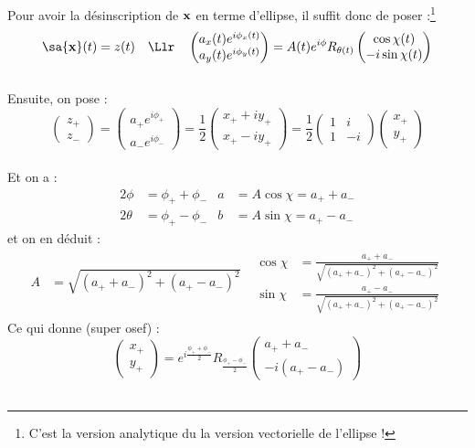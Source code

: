 Pour avoir la désinscription de $\bf{x}$ en terme d’ellipse, il suffit donc de poser :\footnote{C'est la version analytique du la version vectorielle de l'ellipse !}
\[\sa{\bf{x}}(t) = z(t)\quad \Llr\quad \begin{pmatrix}a_x(t) e^{i\phi_x(t)} \\ a_y(t) e^ {i\phi_y(t)}\end{pmatrix} = A(t)e^{i\phi} R_{\theta(t)} \begin{pmatrix} \cos\chi(t) \\ -i\sin\chi(t) \end{pmatrix}\]
\\
Ensuite, on pose :
\[\begin{pmatrix}z_+ \\ z_-\end{pmatrix} = \begin{pmatrix}a_+ e^{i\phi_+} \\ a_- e^{i\phi_-}\end{pmatrix} = \frac{1}{2}\begin{pmatrix}x_+ + iy_+ \\ x_+ - iy_+\end{pmatrix} = \frac{1}{2}\begin{pmatrix}1 & i \\ 1 & -i\end{pmatrix} \begin{pmatrix}x_+ \\ y_+\end{pmatrix}\]
\\
Et on a :
\begin{align*}
	2\phi &= \phi_+ + \phi_-  &  a &= A\cos\chi = a_+ + a_- \\
	2\theta &= \phi_+ - \phi_-  &  b &= A\sin\chi = a_+ - a_- 
\end{align*}
et on en déduit :
\begin{align*}
	A &= \sqrt{(a_+ + a_-)^2 + (a_+ - a_-)^2}  &  \begin{aligned} \cos\chi &= \frac{a_+ + a_- }{\sqrt{(a_+ + a_-)^2 + (a_+ - a_-)^2}}  \\  \sin\chi &= \frac{a_+ - a_- }{\sqrt{(a_+ + a_-)^2 + (a_+ - a_-)^2}}	\end{aligned}
\end{align*}
Ce qui donne \infine (super osef) :
\[\begin{pmatrix}x_+ \\ y_+\end{pmatrix} = e^{i\frac{\phi_+ + \phi_-}{2}} R_{\frac{\phi_+ - \phi_-}{2}} \begin{pmatrix}a_+ + a_- \\ -i(a_+ - a_-)\end{pmatrix}\]
\\


